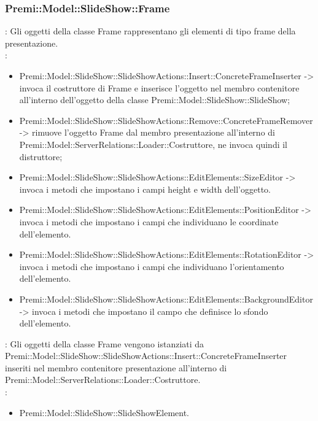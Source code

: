 {           \subsubsection{Premi::Model::SlideShow::Frame}{
				\textbf{\tipo}: Gli oggetti della classe Frame rappresentano gli elementi di tipo frame della presentazione.\\
				\textbf{\relaz}: 
				\begin{itemize}
					\item Premi::Model::SlideShow::SlideShowActions::Insert::ConcreteFrameInserter -> invoca il costruttore di Frame e inserisce l’oggetto nel membro contenitore all’interno dell’oggetto della classe Premi::Model::SlideShow::SlideShow;
                    \item Premi::Model::SlideShow::SlideShowActions::Remove::ConcreteFrameRemover -> rimuove l’oggetto Frame dal membro presentazione all’interno di Premi::Model::ServerRelations::Loader::Costruttore, ne invoca quindi il distruttore;
                    \item Premi::Model::SlideShow::SlideShowActions::EditElements::SizeEditor -> invoca i metodi che impostano i campi height e width dell'oggetto.
                    \item Premi::Model::SlideShow::SlideShowActions::EditElements::PositionEditor -> invoca i metodi che impostano i campi che individuano le coordinate dell'elemento.
                    \item Premi::Model::SlideShow::SlideShowActions::EditElements::RotationEditor -> invoca i metodi che impostano i campi che individuano l'orientamento dell'elemento.
                    \item Premi::Model::SlideShow::SlideShowActions::EditElements::BackgroundEditor -> invoca i metodi che impostano il campo che definisce lo sfondo dell'elemento.
				\end{itemize}	
                \textbf{\interfacce}: Gli oggetti della classe Frame vengono istanziati da Premi::Model::SlideShow::SlideShowActions::Insert::ConcreteFrameInserter inseriti nel membro contenitore presentazione all’interno di Premi::Model::ServerRelations::Loader::Costruttore.\\
                \textbf{\base}: 
                    \begin{itemize}
                    \item Premi::Model::SlideShow::SlideShowElement.
                    \end{itemize}
                    }
}
